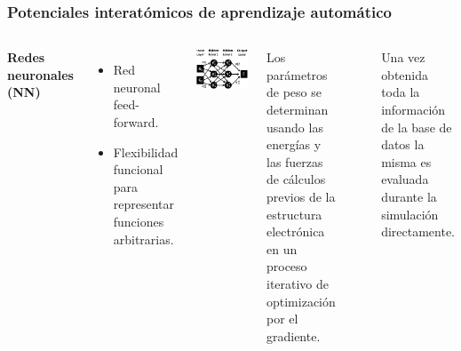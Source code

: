 \documentclass[aspectratio=169]{beamer}
\let\oldtextbf\textbf
\renewcommand{\textbf}[1]{\textcolor{nordblue}{\oldtextbf{#1}}}
\begin{document}
    \begin{frame}
        \frametitle{Potenciales interatómicos de aprendizaje automático}

        \begin{columns}
            \textbf{Redes neuronales (NN)}
            \begin{itemize}
                \item Red neuronal feed-forward.
                \item Flexibilidad funcional para representar funciones
                    arbitrarias.
            \end{itemize}

            \begin{center}
                \includegraphics[width=\columnwidth]{MLP-NN.png}
            \end{center}
        
            Los parámetros de peso se determinan usando las energías y las fuerzas
            de cálculos previos de la estructura electrónica en un proceso 
            iterativo de optimización por el gradiente.

            \

            Una vez obtenida toda la información de la base de datos la misma es
            evaluada durante la simulación directamente.

        \end{columns}

    \end{frame}
\end{document}
